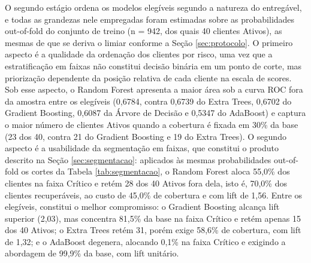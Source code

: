 O segundo estágio ordena os modelos elegíveis segundo a natureza do entregável, e todas as grandezas nele empregadas foram estimadas sobre as probabilidades out-of-fold do conjunto de treino (n = 942, dos quais 40 clientes Ativos), as mesmas de que se deriva o limiar conforme a Seção \ref{sec:protocolo}. O primeiro aspecto é a qualidade da ordenação dos clientes por risco, uma vez que a estratificação em faixas não constitui decisão binária em um ponto de corte, mas priorização dependente da posição relativa de cada cliente na escala de scores. Sob esse aspecto, o Random Forest apresenta a maior área sob a curva ROC fora da amostra entre os elegíveis (0,6784, contra 0,6739 do Extra Trees, 0,6702 do Gradient Boosting, 0,6087 da Árvore de Decisão e 0,5347 do AdaBoost) e captura o maior número de clientes Ativos quando a cobertura é fixada em 30\% da base (23 dos 40, contra 21 do Gradient Boosting e 19 do Extra Trees). O segundo aspecto é a usabilidade da segmentação em faixas, que constitui o produto descrito na Seção \ref{sec:segmentacao}: aplicados às mesmas probabilidades out-of-fold os cortes da Tabela \ref{tab:segmentacao}, o Random Forest aloca 55,0\% dos clientes na faixa Crítico e retém 28 dos 40 Ativos fora dela, isto é, 70,0\% dos clientes recuperáveis, ao custo de 45,0\% de cobertura e com lift de 1,56. Entre os elegíveis, constitui o melhor compromisso: o Gradient Boosting alcança lift superior (2,03), mas concentra 81,5\% da base na faixa Crítico e retém apenas 15 dos 40 Ativos; o Extra Trees retém 31, porém exige 58,6\% de cobertura, com lift de 1,32; e o AdaBoost degenera, alocando 0,1\% na faixa Crítico e exigindo a abordagem de 99,9\% da base, com lift unitário.

